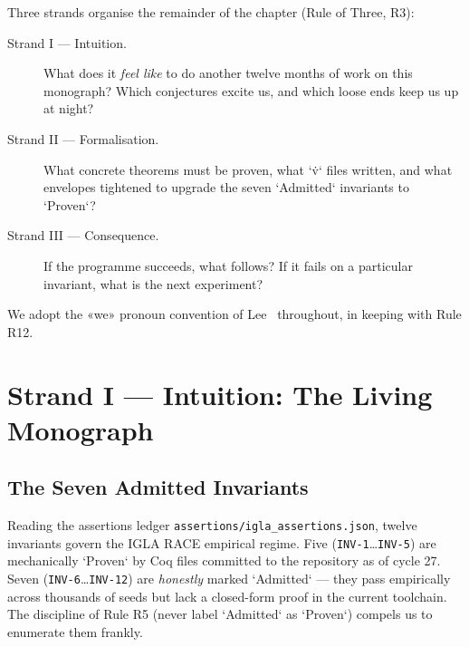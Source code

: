 Three strands organise the remainder of the chapter (Rule of Three, R3):
\begin{description}
    \item[Strand I — Intuition.] What does it \emph{feel like} to do another twelve months of work on this monograph? Which conjectures excite us, and which loose ends keep us up at night?
    \item[Strand II — Formalisation.] What concrete theorems must be proven, what `\.v` files written, and what envelopes tightened to upgrade the seven `Admitted` invariants to `Proven`?
    \item[Strand III — Consequence.] If the programme succeeds, what follows? If it fails on a particular invariant, what is the next experiment?
\end{description}
We adopt the «we» pronoun convention of Lee~\cite{livio_fibonacci_numbers} throughout, in keeping with Rule R12.

\section{Strand I — Intuition: The Living Monograph}
\label{sec:31-strand-1}

\subsection{The Seven Admitted Invariants}
\label{sec:31-seven-admitted}

Reading the assertions ledger \texttt{assertions/igla\_assertions.json}, twelve invariants govern the IGLA RACE empirical regime. Five (\texttt{INV-1}…\texttt{INV-5}) are mechanically `Proven` by Coq files committed to the repository as of cycle 27. Seven (\texttt{INV-6}…\texttt{INV-12}) are \emph{honestly} marked `Admitted` --- they pass empirically across thousands of seeds but lack a closed-form proof in the current toolchain. The discipline of Rule R5 (never label `Admitted` as `Proven`) compels us to enumerate them frankly.

